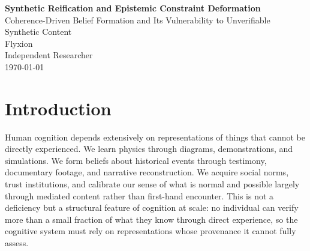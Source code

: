 \documentclass[12pt, a4paper]{article}
\begin{document}
\begin{center}
{\LARGE\bfseries Synthetic Reification and Epistemic Constraint Deformation}\\[0.5em]
{\large Coherence-Driven Belief Formation and Its Vulnerability to Unverifiable Synthetic Content}\\[1.5em]
{\normalsize Flyxion}\\
{\small Independent Researcher}\\[0.3em]
{\small\today}
\end{center}

\vspace{1em}

\begin{abstract}
\noindent Cognitive reconstruction prioritizes coherence over provenance: the mind accepts representations not because they can be verified against lived experience but because they satisfy internal consistency constraints. This paper formalizes that vulnerability through the CLIO architecture (Cheng, Broadbent, and Chappell, 2025) and the RSVP field framework, demonstrating that any reconstructive system with non-invertible projection and coherence-based acceptance is structurally indifferent to the origin of its inputs. The vulnerability has particular force for content that cannot be verified through direct experience: news events, scientific findings, historical sequences, social norms, and demonstrations of tool use or physical phenomena. When such content is rendered in high-fidelity synthetic form --- visually and aurally concrete, narratively consistent, and perceptually dense --- it satisfies the same acceptance conditions as genuine testimony or observation. We develop a stability theorem governing when repeated exposure to synthetic reifications of unverifiable content produces stable shifts in the constraint surface governing belief and trust, and when those shifts become self-reinforcing. The implications are especially significant for developmental contexts, where trust calibration and epistemic norms are being established for the first time against a corpus that now includes arbitrary synthetic content.
\end{abstract}

\newpage

\section{Introduction}

Human cognition depends extensively on representations of things that cannot be directly experienced. We learn physics through diagrams, demonstrations, and simulations. We form beliefs about historical events through testimony, documentary footage, and narrative reconstruction. We acquire social norms, trust institutions, and calibrate our sense of what is normal and possible largely through mediated content rather than first-hand encounter. This is not a deficiency but a structural feature of cognition at scale: no individual can verify more than a small fraction of what they know through direct experience, so the cognitive system must rely on representations whose provenance it cannot fully assess.
\end{document}
